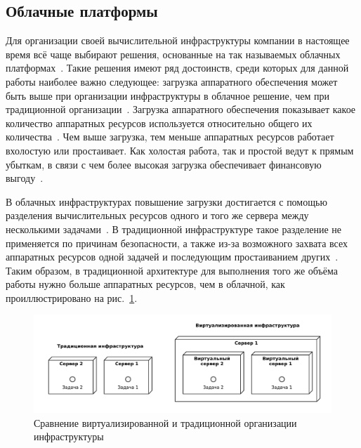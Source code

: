 \subsection{Облачные платформы}
Для организации своей вычислительной инфраструктуры компании в настоящее время всё чаще выбирают решения, основанные на так называемых облачных платформах~\cite{fake-16}.
Такие решения имеют ряд достоинств, среди которых для данной работы наиболее важно следующее: загрузка аппаратного обеспечения может быть выше при организации инфраструктуры в облачное решение, чем при традиционной организации~\cite{cloud-computing-concepts}.
Загрузка аппаратного обеспечения показывает какое количество аппаратных ресурсов используется относительно общего их количества~\cite{fake-17}.
Чем выше загрузка, тем меньше аппаратных ресурсов работает вхолостую или простаивает.
Как холостая работа, так и простой ведут к прямым убыткам, в связи с чем более высокая загрузка обеспечивает финансовую выгоду~\cite{fake-19}.

В облачных инфраструктурах повышение загрузки достигается с помощью разделения вычислительных ресурсов одного и того же сервера между несколькими задачами~\cite{fake-20}.
В традиционной инфраструктуре такое разделение не применяется по причинам безопасности, а также из-за возможного захвата всех аппаратных ресурсов одной задачей и последующим простаиванием других~\cite{fake-22}.
Таким образом, в традиционной архитектуре для выполнения того же объёма работы нужно больше аппаратных ресурсов, чем в облачной, как проиллюстрировано на рис.~\ref{load-utilization}.

\begin{figure}[hbtp]
    \centering
    \includegraphics[width=\textwidth]{img/trad-cloud.pdf}
    \caption{Сравнение виртуализированной и традиционной организации инфраструктуры}
    \label{load-utilization}
\end{figure}
